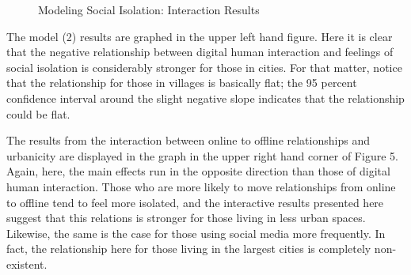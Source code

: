 \documentclass[]{interact}
\theoremstyle{plain}%
\theoremstyle{definition}
\theoremstyle{remark}
\begin{document}
\begin{figure}


\caption{\label{fig-social-isolation-interactions}Modeling Social
Isolation: Interaction Results}

\end{figure}%

The model (2) results are graphed in the upper left hand figure. Here it
is clear that the negative relationship between digital human
interaction and feelings of social isolation is considerably stronger
for those in cities. For that matter, notice that the relationship for
those in villages is basically flat; the 95 percent confidence interval
around the slight negative slope indicates that the relationship could
be flat.

The results from the interaction between online to offline relationships
and urbanicity are displayed in the graph in the upper right hand corner
of Figure 5. Again, here, the main effects run in the opposite direction
than those of digital human interaction. Those who are more likely to
move relationships from online to offline tend to feel more isolated,
and the interactive results presented here suggest that this relations
is stronger for those living in less urban spaces. Likewise, the same is
the case for those using social media more frequently. In fact, the
relationship here for those living in the largest cities is completely
non-existent.
\end{document}
